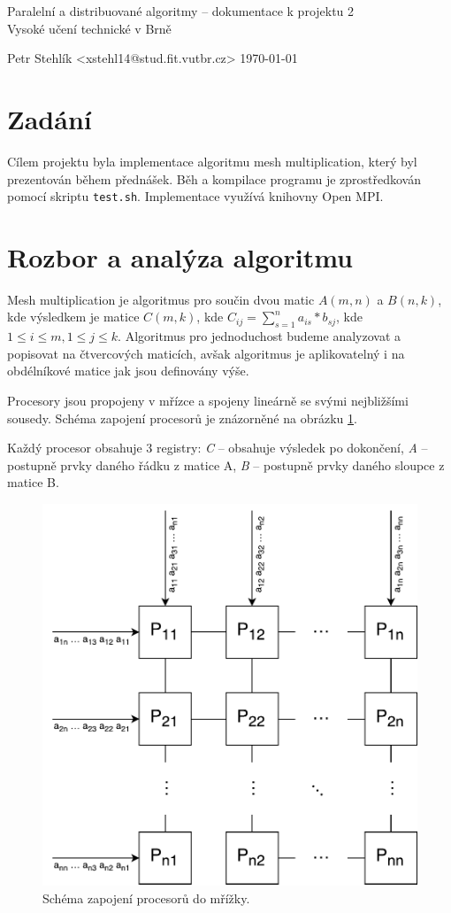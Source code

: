 \documentclass[11pt,a4paper]{article}
\begin{document}
\begin{center}
	\LARGE{Paralelní a distribuované algoritmy -- dokumentace k projektu 2}\\
	\large{Vysoké učení technické v Brně}
	\vspace{0.2cm}

	Petr Stehlík <xstehl14@stud.fit.vutbr.cz>     \today

\end{center}

\section{Zadání}

Cílem projektu byla implementace algoritmu mesh multiplication, který byl prezentován během přednášek. Běh a kompilace programu je zprostředkován pomocí skriptu \texttt{test.sh}. Implementace využívá knihovny Open MPI\cite{bib:openmpi}.

\section{Rozbor a analýza algoritmu}

Mesh multiplication je algoritmus pro součin dvou matic $A(m,n)$ a $B(n,k)$, kde výsledkem je matice $C (m,k)$, kde $C_{ij} = \sum\limits_{s=1}^n a_{is} * b_{sj}$, kde $1 \leq i \leq m, 1 \leq j \leq k$. Algoritmus pro jednoduchost budeme analyzovat a popisovat na čtvercových maticích, avšak algoritmus je aplikovatelný i na obdélníkové matice jak jsou definovány výše.

Procesory jsou propojeny v mřízce a spojeny lineárně se svými nejbližšími sousedy. Schéma zapojení procesorů je znázorněné na obrázku \ref{schema}.

Každý procesor obsahuje 3 registry: \textit{C} -- obsahuje výsledek po dokončení, \textit{A} -- postupně prvky daného řádku z matice A, \textit{B} -- postupně prvky daného sloupce z matice B.

\begin{figure}[h]
    \includegraphics[width=0.7\linewidth]{mesh}
    \centering
	\caption{Schéma zapojení procesorů do mřížky.}
    \label{schema}
\end{figure}
\end{document}
